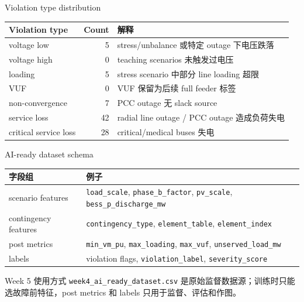 \documentclass[aspectratio=169,11pt]{beamer}
\begin{document}
\begin{frame}{Violation type distribution}
\scriptsize
\begin{tabular}{lrp{6.0cm}}
\toprule
Violation type & Count & 解释 \\
\midrule
voltage low & 5 & stress/unbalance 或特定 outage 下电压跌落 \\
voltage high & 0 & teaching scenarios 未触发过电压 \\
loading & 5 & stress scenario 中部分 line loading 超限 \\
VUF & 0 & VUF 保留为后续 full feeder 标签 \\
non-convergence & 7 & PCC outage 无 slack source \\
service loss & 42 & radial line outage / PCC outage 造成负荷失电 \\
critical service loss & 28 & critical/medical buses 失电 \\
\bottomrule
\end{tabular}
\end{frame}

\begin{frame}{AI-ready dataset schema}
\scriptsize
\begin{tabular}{ll}
\toprule
字段组 & 例子 \\
\midrule
scenario features & \texttt{load\_scale}, \texttt{phase\_b\_factor}, \texttt{pv\_scale}, \texttt{bess\_p\_discharge\_mw} \\
contingency features & \texttt{contingency\_type}, \texttt{element\_table}, \texttt{element\_index} \\
post metrics & \texttt{min\_vm\_pu}, \texttt{max\_loading}, \texttt{max\_vuf}, \texttt{unserved\_load\_mw} \\
labels & violation flags, \texttt{violation\_label}, \texttt{severity\_score} \\
\bottomrule
\end{tabular}
\vspace{0.25cm}

\begin{block}{Week 5 使用方式}
\texttt{week4\_ai\_ready\_dataset.csv} 是原始监督数据源；训练时只能选故障前特征，post metrics 和 labels 只用于监督、评估和作图。
\end{block}
\end{frame}
\end{document}

